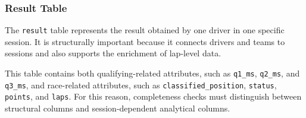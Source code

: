 \documentclass[a4paper,11pt]{article}
\begin{document}
	\subsubsection{Result Table}
	
	The \texttt{result} table represents the result obtained by one driver in one
	specific session. It is structurally important because it connects drivers and
	teams to sessions and also supports the enrichment of lap-level data.
	
	This table contains both qualifying-related attributes, such as \texttt{q1\_ms},
	\texttt{q2\_ms}, and \texttt{q3\_ms}, and race-related attributes, such as
	\texttt{classified\_position}, \texttt{status}, \texttt{points}, and \texttt{laps}.
	For this reason, completeness checks must distinguish between structural columns
	and session-dependent analytical columns.
	
\end{document}
